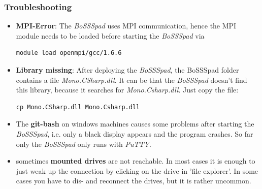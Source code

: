 \documentclass[11pt,twoside,a4paper]{fdyartcl}
\newcommand{\clearemptydoublepage}%
{\newpage{\pagestyle{empty}\cleardoublepage}}
\begin{document}
\subsubsection{Troubleshooting}
\begin{itemize}
\item \textbf{MPI-Error}:  The \emph{BoSSSpad} uses MPI communication, hence the MPI module needs to be loaded before starting the \emph{BoSSSpad} via
\begin{verbatim}
module load openmpi/gcc/1.6.6
\end{verbatim}
\item \textbf{Library missing}: After deploying the \emph{BoSSSpad}, the BoSSSpad folder contains a file \emph{Mono.CSharp.dll}. It can be that the \emph{BoSSSpad} doesn't find this library, because it searches for \emph{Mono.Csharp.dll}. Just copy the file:
\begin{verbatim}
cp Mono.CSharp.dll Mono.Csharp.dll
\end{verbatim}
\item The \textbf{git-bash} on windows machines causes some problems after starting the \emph{BoSSSpad}, i.e. only a black display appears and the program crashes. So far only the \emph{BoSSSpad} only runs with \emph{PuTTY}.
\item sometimes \textbf{mounted drives} are not reachable. In most cases it is enough to just weak up the connection by clicking on the drive in 'file explorer'. In some cases you have to dis- and reconnect the drives, but it is rather uncommon.
\end{itemize}


%


\clearemptydoublepage
\end{document}
